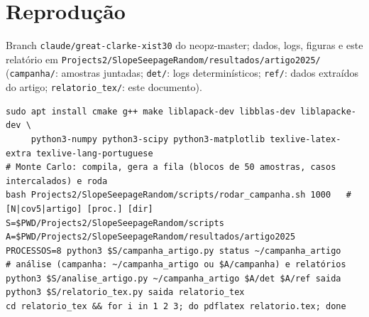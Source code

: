 \documentclass[11pt,a4paper]{article}
\begin{document}
\section{Reprodução}
{\sloppy Branch \texttt{claude/great-clarke-xist30} do neopz-master; dados, logs, figuras e este relatório em
\texttt{Projects2/SlopeSeepageRandom/resultados/artigo2025/} (\texttt{campanha/}: amostras juntadas;
\texttt{det/}: logs determinísticos; \texttt{ref/}: dados extraídos do artigo; \texttt{relatorio\_tex/}: este
documento).\par}
\par\noindent\begin{minipage}{\textwidth}\footnotesize
\begin{verbatim}
sudo apt install cmake g++ make liblapack-dev libblas-dev liblapacke-dev \
     python3-numpy python3-scipy python3-matplotlib texlive-latex-extra texlive-lang-portuguese
# Monte Carlo: compila, gera a fila (blocos de 50 amostras, casos intercalados) e roda
bash Projects2/SlopeSeepageRandom/scripts/rodar_campanha.sh 1000   # [N|cov5|artigo] [proc.] [dir]
S=$PWD/Projects2/SlopeSeepageRandom/scripts
A=$PWD/Projects2/SlopeSeepageRandom/resultados/artigo2025
PROCESSOS=8 python3 $S/campanha_artigo.py status ~/campanha_artigo
# análise (campanha: ~/campanha_artigo ou $A/campanha) e relatórios
python3 $S/analise_artigo.py ~/campanha_artigo $A/det $A/ref saida
python3 $S/relatorio_tex.py saida relatorio_tex
cd relatorio_tex && for i in 1 2 3; do pdflatex relatorio.tex; done
\end{verbatim}
\end{minipage}
\end{document}
